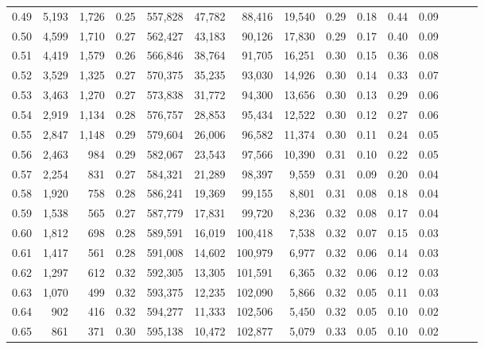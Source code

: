 \begin{tabular}{rrrrrrrrrrrrrrr}
0.49 &   5,193 &  1,726 &  0.25 &  557,828 &   47,782 &   88,416 &   19,540 &  0.29 &  0.18 &  0.44 &      0.09 \\
0.50 &   4,599 &  1,710 &  0.27 &  562,427 &   43,183 &   90,126 &   17,830 &  0.29 &  0.17 &  0.40 &      0.09 \\
0.51 &   4,419 &  1,579 &  0.26 &  566,846 &   38,764 &   91,705 &   16,251 &  0.30 &  0.15 &  0.36 &      0.08 \\
0.52 &   3,529 &  1,325 &  0.27 &  570,375 &   35,235 &   93,030 &   14,926 &  0.30 &  0.14 &  0.33 &      0.07 \\
0.53 &   3,463 &  1,270 &  0.27 &  573,838 &   31,772 &   94,300 &   13,656 &  0.30 &  0.13 &  0.29 &      0.06 \\
0.54 &   2,919 &  1,134 &  0.28 &  576,757 &   28,853 &   95,434 &   12,522 &  0.30 &  0.12 &  0.27 &      0.06 \\
0.55 &   2,847 &  1,148 &  0.29 &  579,604 &   26,006 &   96,582 &   11,374 &  0.30 &  0.11 &  0.24 &      0.05 \\
0.56 &   2,463 &    984 &  0.29 &  582,067 &   23,543 &   97,566 &   10,390 &  0.31 &  0.10 &  0.22 &      0.05 \\
0.57 &   2,254 &    831 &  0.27 &  584,321 &   21,289 &   98,397 &    9,559 &  0.31 &  0.09 &  0.20 &      0.04 \\
0.58 &   1,920 &    758 &  0.28 &  586,241 &   19,369 &   99,155 &    8,801 &  0.31 &  0.08 &  0.18 &      0.04 \\
0.59 &   1,538 &    565 &  0.27 &  587,779 &   17,831 &   99,720 &    8,236 &  0.32 &  0.08 &  0.17 &      0.04 \\
0.60 &   1,812 &    698 &  0.28 &  589,591 &   16,019 &  100,418 &    7,538 &  0.32 &  0.07 &  0.15 &      0.03 \\
0.61 &   1,417 &    561 &  0.28 &  591,008 &   14,602 &  100,979 &    6,977 &  0.32 &  0.06 &  0.14 &      0.03 \\
0.62 &   1,297 &    612 &  0.32 &  592,305 &   13,305 &  101,591 &    6,365 &  0.32 &  0.06 &  0.12 &      0.03 \\
0.63 &   1,070 &    499 &  0.32 &  593,375 &   12,235 &  102,090 &    5,866 &  0.32 &  0.05 &  0.11 &      0.03 \\
0.64 &     902 &    416 &  0.32 &  594,277 &   11,333 &  102,506 &    5,450 &  0.32 &  0.05 &  0.10 &      0.02 \\
0.65 &     861 &    371 &  0.30 &  595,138 &   10,472 &  102,877 &    5,079 &  0.33 &  0.05 &  0.10 &      0.02 \\

\end{tabular}
